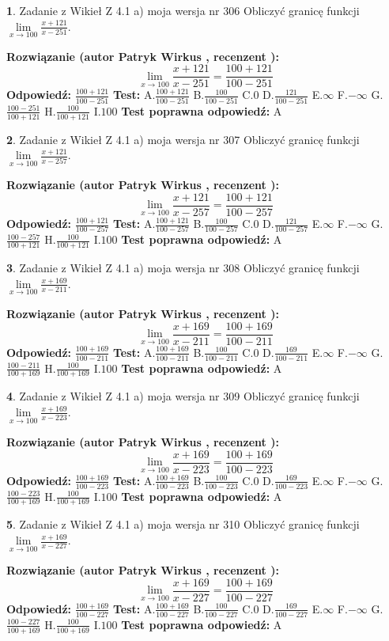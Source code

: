 \documentclass[12pt, a4paper]{article}
\theoremstyle{definition} %
\newtheorem{zad}{}
\newcommand{\zadStart}[1]{\begin{zad}#1\newline}
\newcommand{\zadStop}{\end{zad}}
\newcommand{\rozwStart}[2]{\noindent \textbf{Rozwiązanie (autor #1 , recenzent #2): }\newline}
\newcommand{\rozwStop}{\newline}
\newcommand{\odpStart}{\noindent \textbf{Odpowiedź:}\newline}
\newcommand{\odpStop}{\newline}
\newcommand{\testStart}{\noindent \textbf{Test:}\newline}
\newcommand{\testStop}{\newline}
\newcommand{\kluczStart}{\noindent \textbf{Test poprawna odpowiedź:}\newline}
\newcommand{\kluczStop}{\newline}
\begin{document}
\zadStart{Zadanie z Wikieł Z 4.1 a) moja wersja nr 306}
Obliczyć granicę funkcji $\lim\limits_{x\to100}\frac{x+121}{x-251}$.
\zadStop
\rozwStart{Patryk Wirkus}{}
$$\lim\limits_{x\to100}\frac{x+121}{x-251} = \frac{100+121}{100-251}$$
\rozwStop
\odpStart
$\frac{100+121}{100-251}$
\odpStop
\testStart
A.$\frac{100+121}{100-251}$
B.$\frac{100}{100-251}$
C.$0$
D.$\frac{121}{100-251}$
E.$\infty$
F.$-\infty$
G.$\frac{100-251}{100+121}$
H.$\frac{100}{100+121}$
I.$100$
\testStop
\kluczStart
A
\kluczStop



\zadStart{Zadanie z Wikieł Z 4.1 a) moja wersja nr 307}
Obliczyć granicę funkcji $\lim\limits_{x\to100}\frac{x+121}{x-257}$.
\zadStop
\rozwStart{Patryk Wirkus}{}
$$\lim\limits_{x\to100}\frac{x+121}{x-257} = \frac{100+121}{100-257}$$
\rozwStop
\odpStart
$\frac{100+121}{100-257}$
\odpStop
\testStart
A.$\frac{100+121}{100-257}$
B.$\frac{100}{100-257}$
C.$0$
D.$\frac{121}{100-257}$
E.$\infty$
F.$-\infty$
G.$\frac{100-257}{100+121}$
H.$\frac{100}{100+121}$
I.$100$
\testStop
\kluczStart
A
\kluczStop



\zadStart{Zadanie z Wikieł Z 4.1 a) moja wersja nr 308}
Obliczyć granicę funkcji $\lim\limits_{x\to100}\frac{x+169}{x-211}$.
\zadStop
\rozwStart{Patryk Wirkus}{}
$$\lim\limits_{x\to100}\frac{x+169}{x-211} = \frac{100+169}{100-211}$$
\rozwStop
\odpStart
$\frac{100+169}{100-211}$
\odpStop
\testStart
A.$\frac{100+169}{100-211}$
B.$\frac{100}{100-211}$
C.$0$
D.$\frac{169}{100-211}$
E.$\infty$
F.$-\infty$
G.$\frac{100-211}{100+169}$
H.$\frac{100}{100+169}$
I.$100$
\testStop
\kluczStart
A
\kluczStop



\zadStart{Zadanie z Wikieł Z 4.1 a) moja wersja nr 309}
Obliczyć granicę funkcji $\lim\limits_{x\to100}\frac{x+169}{x-223}$.
\zadStop
\rozwStart{Patryk Wirkus}{}
$$\lim\limits_{x\to100}\frac{x+169}{x-223} = \frac{100+169}{100-223}$$
\rozwStop
\odpStart
$\frac{100+169}{100-223}$
\odpStop
\testStart
A.$\frac{100+169}{100-223}$
B.$\frac{100}{100-223}$
C.$0$
D.$\frac{169}{100-223}$
E.$\infty$
F.$-\infty$
G.$\frac{100-223}{100+169}$
H.$\frac{100}{100+169}$
I.$100$
\testStop
\kluczStart
A
\kluczStop



\zadStart{Zadanie z Wikieł Z 4.1 a) moja wersja nr 310}
Obliczyć granicę funkcji $\lim\limits_{x\to100}\frac{x+169}{x-227}$.
\zadStop
\rozwStart{Patryk Wirkus}{}
$$\lim\limits_{x\to100}\frac{x+169}{x-227} = \frac{100+169}{100-227}$$
\rozwStop
\odpStart
$\frac{100+169}{100-227}$
\odpStop
\testStart
A.$\frac{100+169}{100-227}$
B.$\frac{100}{100-227}$
C.$0$
D.$\frac{169}{100-227}$
E.$\infty$
F.$-\infty$
G.$\frac{100-227}{100+169}$
H.$\frac{100}{100+169}$
I.$100$
\testStop
\kluczStart
A
\kluczStop
\end{document}
